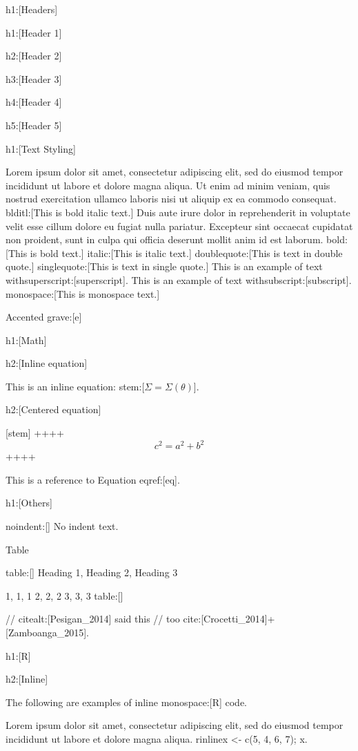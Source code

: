 h1:[Headers]

h1:[Header 1]

h2:[Header 2]

h3:[Header 3]

h4:[Header 4]

h5:[Header 5]

h1:[Text Styling]

Lorem ipsum dolor sit amet, consectetur adipiscing elit, sed do eiusmod tempor incididunt ut labore et dolore magna aliqua. Ut enim ad minim veniam, quis nostrud exercitation ullamco laboris nisi ut aliquip ex ea commodo consequat. blditl:[This is bold italic text.] Duis aute irure dolor in reprehenderit in voluptate velit esse cillum dolore eu fugiat nulla pariatur. Excepteur sint occaecat cupidatat non proident, sunt in culpa qui officia deserunt mollit anim id est laborum. bold:[This is bold text.] italic:[This is italic text.] doublequote:[This is text in double quote.] singlequote:[This is text in single quote.] This is an example of text withsuperscript:[superscript]. This is an example of text withsubscript:[subscript]. monospace:[This is monospace text.]

Accented grave:[e]

h1:[Math]

h2:[Inline equation]

This is an inline equation: stem:[$\Sigma = \Sigma \left( \theta \right)$].

h2:[Centered equation]

[stem]
++++
\begin{equation}
\label{eq}
  c^2 = a^2 + b^2
\end{equation}
++++

This is a reference to Equation eqref:[eq].

h1:[Others]

noindent:[] No indent text.

Table

table:[]
Heading 1, Heading 2, Heading 3

1, 1, 1
2, 2, 2
3, 3, 3
table:[]

// citealt:[Pesigan_2014] said this
// too cite:[Crocetti_2014]+[Zamboanga_2015].

h1:[R]

h2:[Inline]

The following are examples of inline monospace:[R] code.

Lorem ipsum dolor sit amet,
consectetur adipiscing elit,
sed do eiusmod tempor incididunt ut labore et dolore magna aliqua. rinline{x <- c(5, 4, 6, 7); x}.

